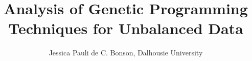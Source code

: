 \documentclass[journal]{IEEEtran}
\begin{document}
%
\title{Analysis of Genetic Programming Techniques for Unbalanced Data}
%
%
%

\author{Jessica Pauli de C. Bonson, Dalhousie University}

% 
%










\maketitle
\end{document}
